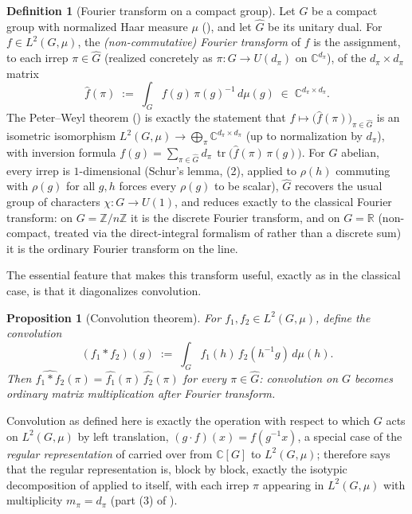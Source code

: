 \documentclass[11pt]{article}
\theoremstyle{plain}
\newtheorem{Proposition}{Proposition}[section]
\theoremstyle{definition}
\newtheorem{Definition}{Definition}[section]
\begin{document}
\begin{Definition}[Fourier transform on a compact group]
\label{def:group-fourier-transform}
Let $G$ be a compact group with normalized Haar measure $\mu$
(), and let $\widehat{G}$ be its
unitary dual. For $f \in L^2(G,\mu)$, the \emph{(non-commutative) Fourier
transform} of $f$ is the assignment, to each irrep $\pi \in \widehat{G}$
(realized concretely as $\pi : G \to U(d_\pi)$ on $\mathbb{C}^{d_\pi}$), of
the $d_\pi \times d_\pi$ matrix
\[
    \widehat{f}(\pi) \;:=\; \int_G f(g)\, \pi(g)^{-1} \, d\mu(g) \;\in\; \mathbb{C}^{d_\pi \times d_\pi}.
\]
The Peter--Weyl theorem () is exactly the
statement that $f \mapsto \big(\widehat{f}(\pi)\big)_{\pi \in \widehat{G}}$
is an isometric isomorphism $L^2(G,\mu) \to \bigoplus_\pi \mathbb{C}^{d_\pi
\times d_\pi}$ (up to normalization by $d_\pi$), with inversion formula
$f(g) = \sum_{\pi \in \widehat{G}} d_\pi \,\operatorname{tr}\bigl(\widehat{f}(\pi)\,\pi(g)\bigr)$.
For $G$ abelian, every irrep is $1$-dimensional (Schur's lemma,
(2), applied to $\rho(h)$ commuting with $\rho(g)$ for
all $g,h$ forces every $\rho(g)$ to be scalar), $\widehat{G}$ recovers the
usual group of characters $\chi : G \to U(1)$, and
 reduces exactly to the
classical Fourier transform: on $G = \mathbb{Z}/n\mathbb{Z}$ it is the
discrete Fourier transform, and on $G = \mathbb{R}$ (non-compact, treated
via the direct-integral formalism of
 rather than a discrete sum) it
is the ordinary Fourier transform on the line.
\end{Definition}

The essential feature that makes this transform useful, exactly as in the
classical case, is that it diagonalizes convolution.

\begin{Proposition}[Convolution theorem]
\label{prop:convolution-theorem}
For $f_1, f_2 \in L^2(G,\mu)$, define the \emph{convolution}
\[
    (f_1 * f_2)(g) \;:=\; \int_G f_1(h)\, f_2(h^{-1}g)\, d\mu(h).
\]
Then $\widehat{f_1 * f_2}(\pi) = \widehat{f_1}(\pi)\, \widehat{f_2}(\pi)$ for
every $\pi \in \widehat{G}$: convolution on $G$ becomes ordinary matrix
multiplication after Fourier transform.
\end{Proposition}

Convolution as defined here is exactly the operation with respect to which
$G$ acts on $L^2(G,\mu)$ by left translation, $(g \cdot f)(x) = f(g^{-1}x)$,
a special case of the \emph{regular representation} of
 carried over from $\mathbb{C}[G]$ to
$L^2(G,\mu)$;  therefore says that
the regular representation is, block by block, exactly the isotypic
decomposition of  applied to itself,
with each irrep $\pi$ appearing in $L^2(G,\mu)$ with multiplicity
$m_\pi = d_\pi$ (part (3) of ).
\end{document}
